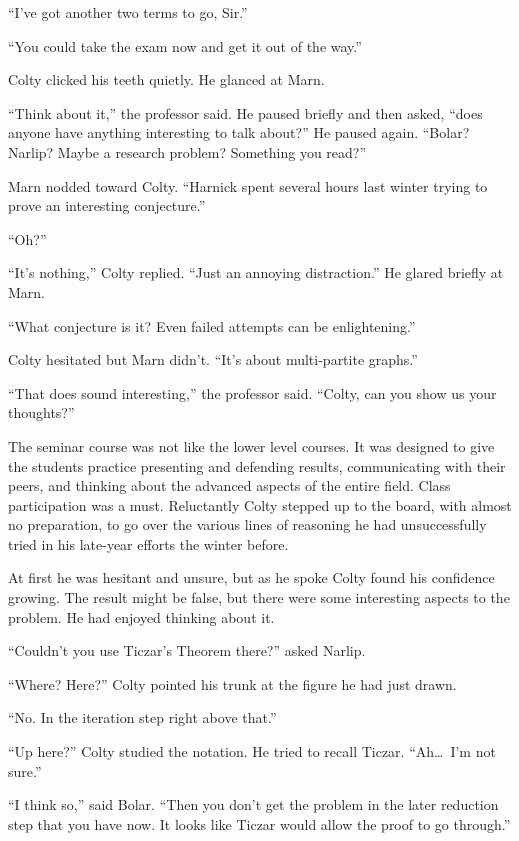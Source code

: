 ``I've got another two terms to go, Sir.''

``You could take the exam now and get it out of the way.''

Colty clicked his teeth quietly. He glanced at Marn.

``Think about it,'' the professor said. He paused briefly and then asked, ``does anyone have
anything interesting to talk about?'' He paused again. ``Bolar? Narlip? Maybe a research
problem? Something you read?''

Marn nodded toward Colty. ``Harnick spent several hours last winter trying to prove an
interesting conjecture.''

``Oh?''

``It's nothing,'' Colty replied. ``Just an annoying distraction.'' He glared briefly at Marn.

``What conjecture is it? Even failed attempts can be enlightening.''

Colty hesitated but Marn didn't. ``It's about multi-partite graphs.''

``That does sound interesting,'' the professor said. ``Colty, can you show us your thoughts?''

The seminar course was not like the lower level courses. It was designed to give the students
practice presenting and defending results, communicating with their peers, and thinking about
the advanced aspects of the entire field. Class participation was a must. Reluctantly Colty
stepped up to the board, with almost no preparation, to go over the various lines of reasoning
he had unsuccessfully tried in his late-year efforts the winter before.

At first he was hesitant and unsure, but as he spoke Colty found his confidence growing. The
result might be false, but there were some interesting aspects to the problem. He had enjoyed
thinking about it.

``Couldn't you use Ticzar's Theorem there?'' asked Narlip.

``Where? Here?'' Colty pointed his trunk at the figure he had just drawn.

``No. In the iteration step right above that.''

``Up here?'' Colty studied the notation. He tried to recall Ticzar. ``Ah\ldots\ I'm not sure.''

``I think so,'' said Bolar. ``Then you don't get the problem in the later reduction step that
you have now. It looks like Ticzar would allow the proof to go through.''

